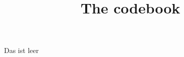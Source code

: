 \documentclass[12pt]{article}
\title{The codebook}
\begin{document}
\maketitle
\pagebreak

Das ist leer
\renewcommand{\baselinestretch}{0.8}\normalsize


\pagebreak




\pagebreak


\pagebreak

\pagebreak

\pagebreak

\pagebreak


\pagebreak

\pagebreak

\pagebreak

\pagebreak

\pagebreak

\pagebreak


\pagebreak
%

\end{document}
